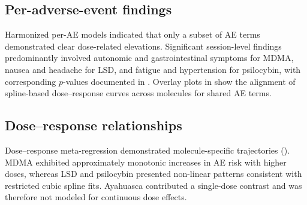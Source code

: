 
\subsection{Per-adverse-event findings}
Harmonized per-AE models indicated that only a subset of AE terms demonstrated clear dose-related elevations. Significant session-level findings predominantly involved autonomic and gastrointestinal symptoms for MDMA, nausea and headache for LSD, and fatigue and hypertension for psilocybin, with corresponding $p$-values documented in . Overlay plots in  show the alignment of spline-based dose--response curves across molecules for shared AE terms.



\subsection{Dose--response relationships}
Dose--response meta-regression demonstrated molecule-specific trajectories (). MDMA exhibited approximately monotonic increases in AE risk with higher doses, whereas LSD and psilocybin presented non-linear patterns consistent with restricted cubic spline fits. Ayahuasca contributed a single-dose contrast and was therefore not modeled for continuous dose effects.


